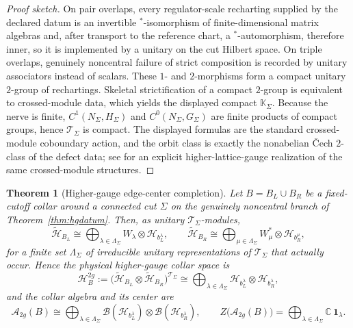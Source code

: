 \documentclass[11pt]{article}
\newtheorem{theorem}{Theorem}[section]
\begin{document}
\begin{proof}[Proof sketch]
On pair overlaps, every regulator-scale recharting supplied by the declared datum is an invertible \(^*\)-isomorphism of finite-dimensional matrix algebras and, after transport to the reference chart, a \(^*\)-automorphism, therefore inner, so it is implemented by a unitary on the cut Hilbert space. On triple overlaps, genuinely noncentral failure of strict composition is recorded by unitary associators instead of scalars. These \(1\)- and \(2\)-morphisms form a compact unitary \(2\)-group of rechartings. Skeletal strictification of a compact \(2\)-group is equivalent to crossed-module data, which yields the displayed compact \(\mathbb K_\Sigma\). Because the nerve is finite, \(C^1(N_\Sigma,H_\Sigma)\) and \(C^0(N_\Sigma,G_\Sigma)\) are finite products of compact groups, hence \(\mathcal T_\Sigma\) is compact. The displayed formulas are the standard crossed-module coboundary action, and the orbit class is exactly the nonabelian \v{C}ech \(2\)-class of the defect data; see \cite{bullivant17} for an explicit higher-lattice-gauge realization of the same crossed-module structures.
\end{proof}

\begin{theorem}[Higher-gauge edge-center completion]\label{thm:hgedgecenter}
Let \(B=B_L\cup B_R\) be a fixed-cutoff collar around a connected cut \(\Sigma\) on the genuinely noncentral branch of Theorem~\ref{thm:hgdatum}. Then, as unitary \(\mathcal T_\Sigma\)-modules,
\[
\widetilde{\mathcal H}_{B_L}
\cong
\bigoplus_{\lambda\in\Lambda_\Sigma}
W_\lambda\otimes \mathcal H_{b_L^\lambda},
\qquad
\widetilde{\mathcal H}_{B_R}
\cong
\bigoplus_{\mu\in\Lambda_\Sigma}
W_\mu^*\otimes \mathcal H_{b_R^\mu},
\]
for a finite set \(\Lambda_\Sigma\) of irreducible unitary representations of \(\mathcal T_\Sigma\) that actually occur. Hence the physical higher-gauge collar space is
\[
\mathcal H_B^{2g}
:=
\bigl(\widetilde{\mathcal H}_{B_L}\otimes \widetilde{\mathcal H}_{B_R}\bigr)^{\mathcal T_\Sigma}
\cong
\bigoplus_{\lambda\in\Lambda_\Sigma}
\mathcal H_{b_L^\lambda}\otimes \mathcal H_{b_R^\lambda},
\]
and the collar algebra and its center are
\[
\mathcal A_{2g}(B)
\cong
\bigoplus_{\lambda\in\Lambda_\Sigma}
\mathcal B(\mathcal H_{b_L^\lambda})\otimes
\mathcal B(\mathcal H_{b_R^\lambda}),
\qquad
Z\bigl(\mathcal A_{2g}(B)\bigr)
=
\bigoplus_{\lambda\in\Lambda_\Sigma}\mathbb C\,\mathbf 1_\lambda.
\]
\end{theorem}
\end{document}

